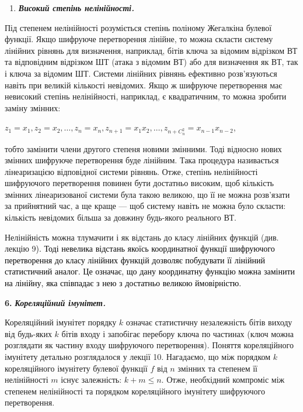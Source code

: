 \bigskip

\liststyleWWviiiNumxxxv
\begin{enumerate}
\item {\bfseries\itshape
Високий степінь нелінійності.}
\end{enumerate}
Під степенем нелінійності розуміється степінь поліному Жегалкіна булевої
функції. Якщо шифруюче перетворення лінійне, то можна скласти систему лінійних
рівнянь для визначення, наприклад, бітів ключа за відомим відрізком ВТ та
відповідним відрізком ШТ (атака з відомим ВТ) або для визначення як ВТ, так і
ключа за відомим ШТ. Системи лінійних рівнянь ефективно розв’язуються навіть
при великій кількості невідомих. Якщо ж шифруюче перетворення має невисокий
степінь нелінійності, наприклад, є квадратичним, то можна зробити заміну
змінних:

{\centering

${z_{{1}}=x_{{1}},z_{{2}}=x_{{2}},\dots,z_{{n}}=x_{{n}},z_{{n+1}}=x_{{1}}x_{{2}},\dots,z_{{n+C_{{n}}^{{2}}}}=x_{n-1}{x_{n-2}}}$,
\par}

тобто замінити члени другого степеня новими змінними. Тоді відносно нових
змінних шифруюче перетворення буде лінійним.  Така процедура називається
лінеаризацією відповідної системи рівнянь. Отже, степінь нелінійності
шифруючого перетворення повинен бути достатньо високим, щоб кількість змінних
лінеаризованої системи була такою\textbf{ }великою, що її не можна розв’язати
за прийнятний час, а ще краще ---\textbf{ }щоб систему\textbf{ }навіть не можна
було скласти: кількість невідомих більша за довжину будь-якого реального ВТ.

Нелінійність можна тлумачити і як відстань до класу лінійних функцій (див.
лекцію 9\textcolor{black}{). Тоді невелика відстань якоїсь координатної функції
шифруючого перетворення до класу лінійних функцій дозволяє побудувати її
лінійний статистичний аналог. Це означає, що дану координатну функцію можна
замінити на лінійну, яка співпадає з нею з достатньо великою ймовірністю.}

\textbf{6.}\textit{  }\textbf{\textit{ Кореляційний імунітет.}}

Кореляційний імунітет порядку  ${k}$ означає статистичну незалежність бітів
виходу від будь-яких  ${k}$ бітів входу і запобігає перебору ключа по частинах
(ключ можна розглядати як частину входу шифруючого перетворення). Поняття
кореляційного імунітету детально розглядалося у лекції 10. Нагадаємо, що між
порядком  ${k}$ кореляційного імунітету булевої функції  ${f}$ від  ${n}$
змінних та степенем її нелінійності  ${m}$ існує залежність:  ${k+m\le n}$.
Отже,  необхідний компроміс між степенем нелінійності та порядком кореляційного
імунітету шифруючого перетворення.


